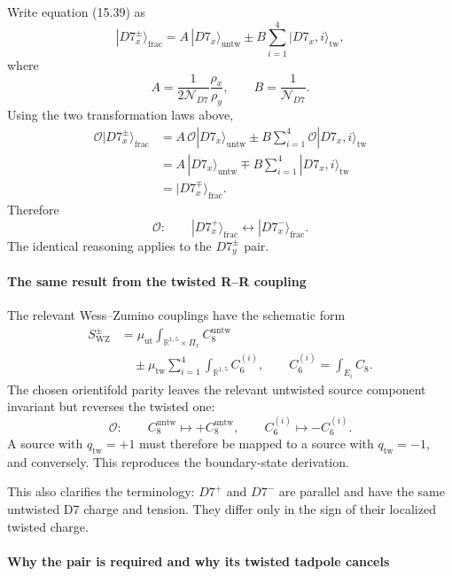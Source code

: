 \documentclass[
  10pt,
  a4paper,
  openany]{book}
\begin{document}
Write equation (15.39) as \[
|D7_x^\pm\rangle_{\mathrm{frac}}
=
A\,|D7_x\rangle_{\mathrm{untw}}
\pm
B\sum_{i=1}^{4}|D7_x,i\rangle_{\mathrm{tw}},
\] where \[
A
=
\frac{1}{2\mathcal N_{D7}}
\frac{\rho_x}{\rho_y},
\qquad
B
=
\frac{1}{\mathcal N_{D7}}.
\] Using the two transformation laws above, \[
\begin{aligned}
\mathcal O
|D7_x^\pm\rangle_{\mathrm{frac}}
&=
A\,\mathcal O|D7_x\rangle_{\mathrm{untw}}
\pm
B\sum_{i=1}^{4}
\mathcal O|D7_x,i\rangle_{\mathrm{tw}}\\
&=
A\,|D7_x\rangle_{\mathrm{untw}}
\mp
B\sum_{i=1}^{4}
|D7_x,i\rangle_{\mathrm{tw}}\\
&=
|D7_x^\mp\rangle_{\mathrm{frac}}.
\end{aligned}
\] Therefore \[
\boxed{
\mathcal O:
\qquad
|D7_x^+\rangle_{\mathrm{frac}}
\longleftrightarrow
|D7_x^-\rangle_{\mathrm{frac}}.
}
\] The identical reasoning applies to the \(D7_y^\pm\) pair.

\paragraph{The same result from the twisted R--R
coupling}\label{the-same-result-from-the-twisted-rr-coupling}

The relevant Wess--Zumino couplings have the schematic form \[
\begin{aligned}
S_{\mathrm{WZ}}^\pm
&=
\mu_{\mathrm{ut}}
\int_{\mathbb R^{1,5}\times\Pi_x}
C_8^{\mathrm{untw}}\\
&\quad
\pm
\mu_{\mathrm{tw}}
\sum_{i=1}^{4}
\int_{\mathbb R^{1,5}}
C_6^{(i)},
\qquad
C_6^{(i)}
=
\int_{E_i}C_8.
\end{aligned}
\] The chosen orientifold parity leaves the relevant untwisted source
component invariant but reverses the twisted one: \[
\mathcal O:
\qquad
C_8^{\mathrm{untw}}
\mapsto
+C_8^{\mathrm{untw}},
\qquad
C_6^{(i)}
\mapsto
-C_6^{(i)}.
\] A source with \(q_{\mathrm{tw}}=+1\) must therefore be mapped to a
source with \(q_{\mathrm{tw}}=-1\), and conversely. This reproduces the
boundary-state derivation.

This also clarifies the terminology: \(D7^+\) and \(D7^-\) are parallel
and have the same untwisted D7 charge and tension. They differ only in
the sign of their localized twisted charge.

\paragraph{Why the pair is required and why its twisted tadpole
cancels}\label{why-the-pair-is-required-and-why-its-twisted-tadpole-cancels}
\end{document}
